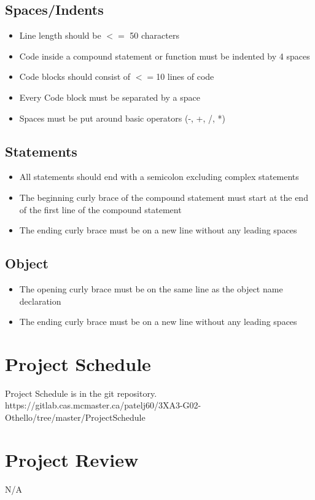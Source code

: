 \documentclass{article}
\begin{document}
\subsection*{Spaces/Indents}
\begin{itemize}
\item Line length should  be $<= $ 50 characters
\item Code inside a compound statement or function must be indented by 4 spaces
\item Code blocks should consist of $<=$10 lines of code
\item Every Code block must be separated by a space
\item Spaces must be put around basic operators (-, +, /, *)
\end{itemize}

\subsection*{Statements}
\begin{itemize}
\item All statements should end with a semicolon excluding complex statements
\item The beginning curly brace of the compound statement must start at the end of the first line of the compound statement
\item The ending curly brace must be on a new line without any leading spaces
\end{itemize}

\subsection*{Object}
\begin{itemize}
\item The opening curly brace must be on the same line as the object name declaration
\item The ending curly brace must be on a new line without any leading spaces
\end{itemize}


\section*{Project Schedule}

Project Schedule is in the git repository. \\
https://gitlab.cas.mcmaster.ca/patelj60/3XA3-G02-Othello/tree/master/ProjectSchedule 

\section*{Project Review}

N/A
\end{document}
